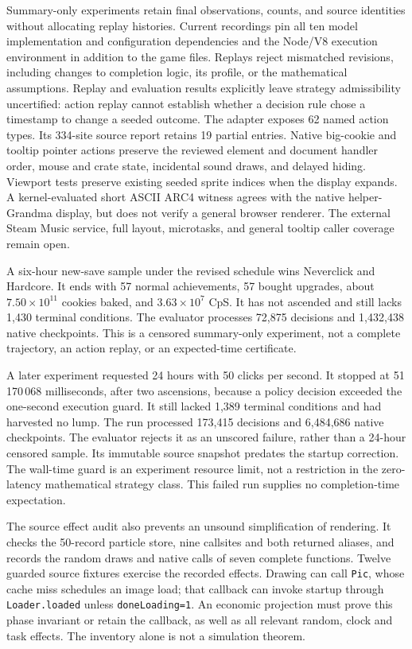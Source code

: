 \documentclass[11pt,a4paper]{article}
\numberwithin{equation}{section}
\theoremstyle{definition}
\theoremstyle{remark}
\begin{document}
Summary-only experiments retain final observations, counts, and source identities without allocating replay histories. Current recordings pin all ten model implementation and configuration dependencies and the Node/V8 execution environment in addition to the game files. Replays reject mismatched revisions, including changes to completion logic, its profile, or the mathematical assumptions. Replay and evaluation results explicitly leave strategy admissibility uncertified: action replay cannot establish whether a decision rule chose a timestamp to change a seeded outcome. The adapter exposes 62 named action types. Its 334-site source report retains 19 partial entries. Native big-cookie and tooltip pointer actions preserve the reviewed element and document handler order, mouse and crate state, incidental sound draws, and delayed hiding. Viewport tests preserve existing seeded sprite indices when the display expands. A kernel-evaluated short ASCII ARC4 witness agrees with the native helper-Grandma display, but does not verify a general browser renderer. The external Steam Music service, full layout, microtasks, and general tooltip caller coverage remain open.

A six-hour new-save sample under the revised schedule wins Neverclick and Hardcore. It ends with 57 normal achievements, 57 bought upgrades, about $7.50\times10^{11}$ cookies baked, and $3.63\times10^7$ CpS. It has not ascended and still lacks 1,430 terminal conditions. The evaluator processes 72,875 decisions and 1,432,438 native checkpoints. This is a censored summary-only experiment, not a complete trajectory, an action replay, or an expected-time certificate.

A later experiment requested 24 hours with 50 clicks per second. It stopped at 51\,170\,068 milliseconds, after two ascensions, because a policy decision exceeded the one-second execution guard. It still lacked 1,389 terminal conditions and had harvested no lump. The run processed 173,415 decisions and 6,484,686 native checkpoints. The evaluator rejects it as an unscored failure, rather than a 24-hour censored sample. Its immutable source snapshot predates the startup correction. The wall-time guard is an experiment resource limit, not a restriction in the zero-latency mathematical strategy class. This failed run supplies no completion-time expectation.

The source effect audit also prevents an unsound simplification of rendering. It checks the 50-record particle store, nine callsites and both returned aliases, and records the random draws and native calls of seven complete functions. Twelve guarded source fixtures exercise the recorded effects. Drawing can call \texttt{Pic}, whose cache miss schedules an image load; that callback can invoke startup through \texttt{Loader.loaded} unless \texttt{doneLoading=1}. An economic projection must prove this phase invariant or retain the callback, as well as all relevant random, clock and task effects. The inventory alone is not a simulation theorem.
\end{document}
